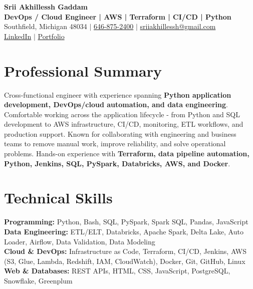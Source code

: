 \documentclass[letterpaper,10pt]{article}
\begin{document}
\fontsize{9.35pt}{10.45pt}\selectfont

\begin{center}
    {\LARGE \textbf{Srii Akhillessh Gaddam}} \\[-1pt]
    \textbf{DevOps / Cloud Engineer | AWS | Terraform | CI/CD | Python} \\[2pt]
    Southfield, Michigan 48034 $|$
    \href{tel:6468752400}{646-875-2400} $|$
    \href{mailto:sriiakhillessh@gmail.com}{sriiakhillessh@gmail.com} \\[1pt]
    \href{https://www.linkedin.com/in/srii-akhiilessh-gaddam-b48668191/}{LinkedIn} $|$
    \href{https://sriiakhillesshg.github.io/portfolio/}{Portfolio}
\end{center}
\vspace{-8pt}

\section{Professional Summary}
\small{Cross-functional engineer with experience spanning \textbf{Python application development, DevOps/cloud automation, and data engineering}. Comfortable working across the application lifecycle - from Python and SQL development to AWS infrastructure, CI/CD, monitoring, ETL workflows, and production support. Known for collaborating with engineering and business teams to remove manual work, improve reliability, and solve operational problems. Hands-on experience with \textbf{Terraform, data pipeline automation, Python, Jenkins, SQL, PySpark, Databricks, AWS, and Docker}.}

\section{Technical Skills}
\small{
\textbf{Programming:} Python, Bash, SQL, PySpark, Spark SQL, Pandas, JavaScript \\
\textbf{Data Engineering:} ETL/ELT, Databricks, Apache Spark, Delta Lake, Auto Loader, Airflow, Data Validation, Data Modeling \\
\textbf{Cloud \& DevOps:} Infrastructure as Code, Terraform, CI/CD, Jenkins, AWS (S3, Glue, Lambda, Redshift, IAM, CloudWatch), Docker, Git, GitHub, Linux \\
\textbf{Web \& Databases:} REST APIs, HTML, CSS, JavaScript, PostgreSQL, Snowflake, Greenplum
}
\end{document}
